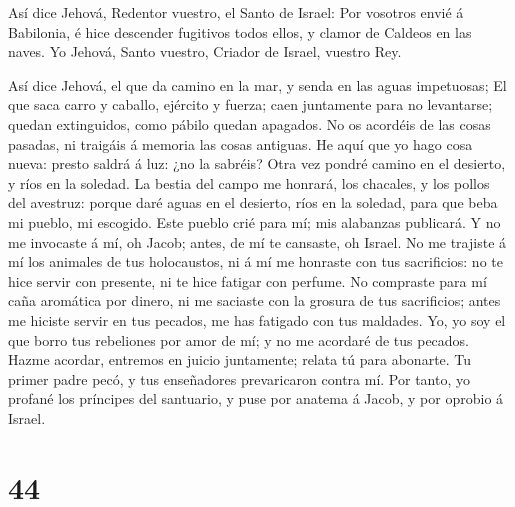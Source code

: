  Así dice Jehová, Redentor vuestro, el Santo de Israel: Por
vosotros envié á Babilonia, é hice descender fugitivos todos ellos, y
clamor de Caldeos en las naves.  Yo Jehová, Santo vuestro,
Criador de Israel, vuestro Rey.

 Así dice Jehová, el que da camino en la mar, y senda en
las aguas impetuosas;  El que saca carro y caballo,
ejército y fuerza; caen juntamente para no levantarse; quedan
extinguidos, como pábilo quedan apagados.  No os acordéis
de las cosas pasadas, ni traigáis á memoria las cosas antiguas.
 He aquí que yo hago cosa nueva: presto saldrá á luz: ¿no
la sabréis? Otra vez pondré camino en el desierto, y ríos en la soledad.
 La bestia del campo me honrará, los chacales, y los pollos
del avestruz: porque daré aguas en el desierto, ríos en la soledad, para
que beba mi pueblo, mi escogido.  Este pueblo crié para mí;
mis alabanzas publicará.  Y no me invocaste á mí, oh Jacob;
antes, de mí te cansaste, oh Israel.  No me trajiste á mí
los animales de tus holocaustos, ni á mí me honraste con tus
sacrificios: no te hice servir con presente, ni te hice fatigar con
perfume.  No compraste para mí caña aromática por dinero,
ni me saciaste con la grosura de tus sacrificios; antes me hiciste
servir en tus pecados, me has fatigado con tus maldades. 
Yo, yo soy el que borro tus rebeliones por amor de mí; y no me acordaré
de tus pecados.  Hazme acordar, entremos en juicio
juntamente; relata tú para abonarte.  Tu primer padre pecó,
y tus enseñadores prevaricaron contra mí.  Por tanto, yo
profané los príncipes del santuario, y puse por anatema á Jacob, y por
oprobio á Israel.

\hypertarget{section-43}{%
\section{44}\label{section-43}}

